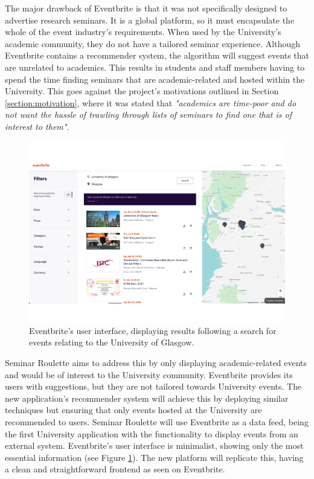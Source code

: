 \documentclass{l4proj}
\begin{document}
The major drawback of Eventbrite is that it was not specifically designed to advertise research seminars. It is a global platform, so it must encapsulate the whole of the event industry's requirements. When used by the University's academic community, they do not have a tailored seminar experience. Although Eventbrite contains a recommender system, the algorithm will suggest events that are unrelated to academics. This results in students and staff members having to spend the time finding seminars that are academic-related and hosted within the University. This goes against the project's motivations outlined in Section \ref{section:motivation}, where it was stated that \emph{"academics are time-poor and do not want the hassle of trawling through lists of seminars to find one that is of interest to them"}.

\begin{figure}[htb]
    \centering
    \includegraphics[width=0.8\linewidth]{images/eventbrite.pdf}    
    \caption{Eventbrite's user interface, displaying results following a search for events relating to the University of Glasgow.}
    \label{fig:eventbrite} 
\end{figure}

Seminar Roulette aims to address this by only displaying academic-related events and would be of interest to the University community. Eventbrite provides its users with suggestions, but they are not tailored towards University events. The new application's recommender system will achieve this by deploying similar techniques but ensuring that only events hosted at the University are recommended to users. Seminar Roulette will use Eventbrite as a data feed, being the first University application with the functionality to display events from an external system. Eventbrite's user interface is minimalist, showing only the most essential information (see Figure \ref{fig:eventbrite}). The new platform will replicate this, having a clean and straightforward frontend as seen on Eventbrite.
\end{document}
